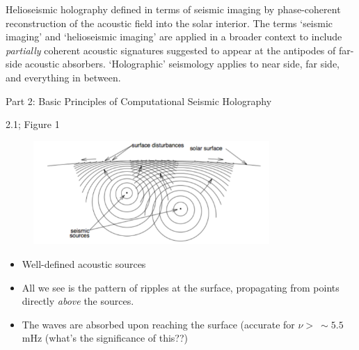 \documentclass{beamer}
\begin{document}
\begin{frame}{1.5}
Helioseismic holography defined in terms of seismic imaging by
phase-coherent reconstruction of the acoustic field into the solar
interior. The terms `seismic imaging' and `helioseismic imaging' are
applied in a broader context to include \emph{partially} coherent
acoustic signatures suggested to appear at the antipodes of far-side
acoustic absorbers. `Holographic' seismology applies to near side, far
side, and everything in between.
\end{frame}

\begin{frame}{Part 2: Basic Principles of Computational Seismic
Holography}
\end{frame}

\begin{frame}{2.1; Figure 1}
    \begin{figure}
        \includegraphics[width=0.8\textwidth]{fig_1.pdf}
    \end{figure}
    \begin{itemize}
        \item Well-defined acoustic sources
        \item All we see is the pattern of ripples at the surface,
            propagating from points directly \emph{above} the sources.
        \item The waves are absorbed upon reaching the surface
            (accurate for $\nu >\ \sim 5.5$ mHz (what's the significance of
            this??)
    \end{itemize}
\end{frame}
\end{document}
